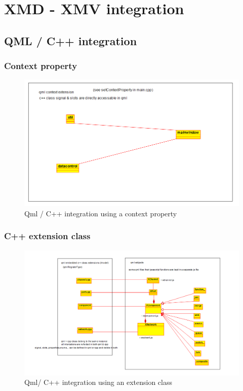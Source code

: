 \section{XMD - XMV integration}

\subsection{QML / C++ integration}

\subsubsection{Context property}

\begin{figure}
    \includegraphics[width=\textwidth]{qml-context-property}
    \caption{Qml / C++ integration using a context property}
\end{figure}


\subsubsection{C++ extension class}

\begin{figure}
    \includegraphics[width=\textwidth]{qml-cpp-extension}
    \caption{Qml/ C++ integration using an extension class}
\end{figure}


